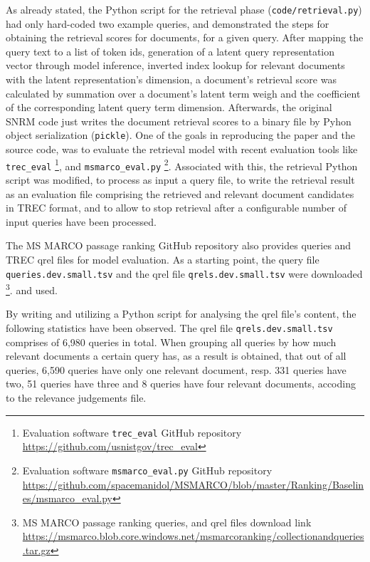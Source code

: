 As already stated, the Python script for the retrieval phase (\texttt{code/retrieval.py}) had only hard-coded two example queries,
    and demonstrated the steps for obtaining the retrieval scores for documents, for a given query.
After mapping the query text to a list of token ids, generation of a latent query representation vector through model inference, 
    inverted index lookup for relevant documents with the latent representation's dimension, a document's retrieval score was
    calculated by summation over a document's latent term weigh and the coefficient of the corresponding latent query term dimension.
Afterwards, the original SNRM code just writes the document retrieval scores to a binary file by Pyhon object serialization (\texttt{pickle}).
One of the goals in reproducing the paper and the source code, was to evaluate the retrieval model with recent evaluation tools like 
    \verb|trec_eval| \footnote{Evaluation software \texttt{trec\_eval} GitHub repository \url{https://github.com/usnistgov/trec_eval}},
    and \verb|msmarco_eval.py| 
    \footnote{Evaluation software \texttt{msmarco\_eval.py} GitHub repository \url{https://github.com/spacemanidol/MSMARCO/blob/master/Ranking/Baselines/msmarco_eval.py}}.
Associated with this, the retrieval Python script was modified, to process as input a query file, to write the retrieval result as an 
    evaluation file comprising the retrieved and relevant document candidates in TREC format, 
    and to allow to stop retrieval after a configurable number of input queries have been processed. 

The MS MARCO passage ranking GitHub repository also provides queries and TREC qrel files for model evaluation.
As a starting point, the query file \texttt{queries.dev.small.tsv} and the qrel file \texttt{qrels.dev.small.tsv} were downloaded
    \footnote{MS MARCO passage ranking queries, and qrel files download link \url{https://msmarco.blob.core.windows.net/msmarcoranking/collectionandqueries.tar.gz} }.
    and used.


By writing and utilizing a Python script for analysing the qrel file's content, the following statistics have been observed.
The qrel file \texttt{qrels.dev.small.tsv} comprises of 6,980 queries in total.
When grouping all queries by how much relevant documents a certain query has, as a result is obtained, that 
    out of all queries, 6,590 queries have only one relevant document, resp. 331 queries have two, 
    51 queries have three and 8 queries have four relevant documents, accoding to the relevance judgements file.

